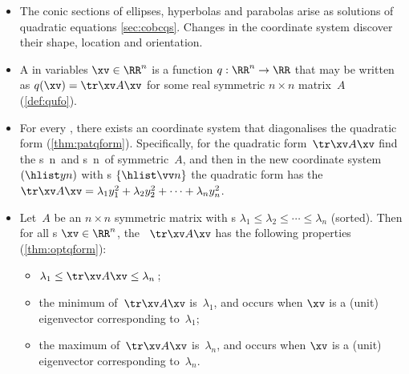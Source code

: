 \begin{itemize}
\itemhi For every real ~\(A\), 
matrix~\(A\) is symmetric iff it is  (\autoref{thm:symspec}).

\item The conic sections of ellipses, hyperbolas and parabolas arise as solutions of quadratic equations \autoref{sec:cobcqs}.
Changes in the coordinate system discover their shape, location and orientation.

\item A  in variables \(\xv\in\RR^n\) is a function \(q:\RR^n\to\RR\) that may be written as \(q(\xv)=\tr\xv A\xv\) for some real symmetric \(n\times n\) matrix~\(A\) (\autoref{def:qufo}).

\item For every , there exists an  coordinate system that diagonalises the quadratic form (\autoref{thm:patqform}).
Specifically, for the quadratic form~\(\tr\xv A\xv\) find the s~\hlist\lambda n\ and  s~\hlist\vv n\ of symmetric~\(A\), and then in the new coordinate system~\((\hlist yn)\) with s \(\{\hlist\vv n\}\) the quadratic form has the  \(\tr\xv A\xv=\lambda_1y_1^2+\lambda_2y_2^2+\cdots+\lambda_ny_n^2\).

\item Let~\(A\) be an \(n\times n\) symmetric matrix with s \(\lambda_1\leq\lambda_2\leq\cdots\leq\lambda_n\) (sorted). 
Then for all s \(\xv\in\RR^n\), the ~\(\tr\xv A\xv\) has the following properties (\autoref{thm:optqform}):
\begin{itemize}
\item \(\lambda_1\leq \tr\xv A\xv\leq\lambda_n\)\,;
\item the minimum of~\(\tr\xv A\xv\) is~\(\lambda_1\), and occurs when \(\xv\) is a (unit) eigenvector corresponding to~\(\lambda_1\);
\item the maximum of~\(\tr\xv A\xv\) is~\(\lambda_n\), and occurs when \(\xv\) is a (unit) eigenvector corresponding to~\(\lambda_n\).
\end{itemize}





\end{itemize}





\makeanswers
